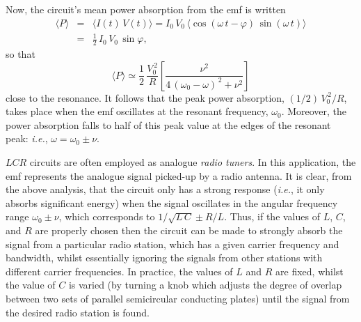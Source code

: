 Now, the circuit's mean power absorption from the emf is written
\begin{eqnarray}
\langle P\rangle &=&\langle I(t)\,V(t)\rangle = I_0\,V_0\,\langle \cos(\omega\,t-\varphi)\,\sin(\omega\,t)\rangle\nonumber\\[0.5ex]
&=& \frac{1}{2}\,I_0\,V_0\,\sin\varphi,
\end{eqnarray}
so that
\begin{equation}
\langle P\rangle \simeq \frac{1}{2}\,\frac{V_0^{\,2}}{R}\left[\frac{\nu^2}{4\,(\omega_0-\omega)^{\,2}+\nu^2}\right]
\end{equation}
close to the resonance.
It follows that the peak power absorption, $(1/2)\,V_0^{\,2}/R$, takes place when the
emf oscillates at the resonant frequency, $\omega_0$. Moreover, the power absorption falls
to half of this peak value at the edges of the resonant peak: {\em i.e.}, $\omega=\omega_0\pm \nu$. 

$LCR$ circuits are often employed as analogue {\em radio tuners}. In this application,
the emf represents the analogue signal picked-up by a radio antenna. It is clear, from the
above analysis, that the circuit only has a strong response ({\em i.e.}, it only absorbs significant energy) when
the signal oscillates in the angular frequency range $\omega_0\pm \nu$, which corresponds
to $1/\sqrt{L\,C}\pm R/L$. Thus, if the values of $L$, $C$, and $R$ are
properly chosen then the circuit can be made to  strongly absorb the signal from a
particular radio station, which has  a given carrier frequency and bandwidth, whilst essentially ignoring the signals from other stations
with different carrier frequencies. In practice, the values of $L$ and $R$ are fixed,
whilst the value of $C$ is varied (by turning a knob which adjusts the degree of overlap
between two sets of parallel semicircular conducting plates) until the signal from the desired radio
station is found. 

